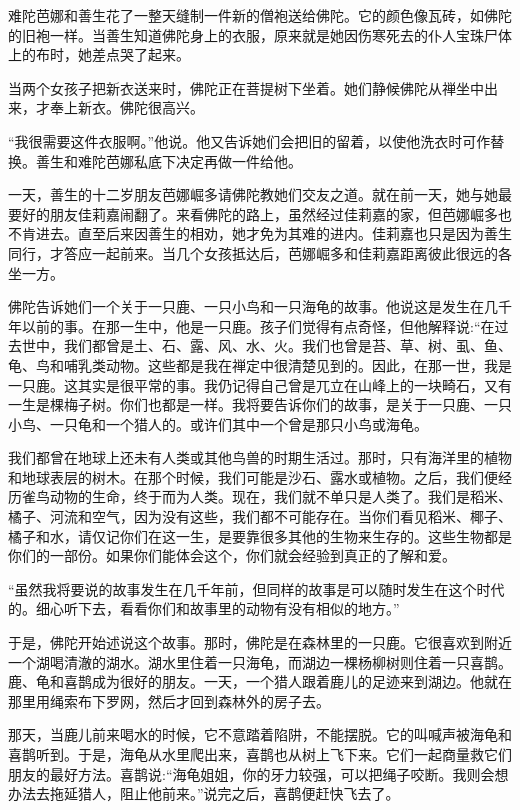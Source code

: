 \documentclass[12pt,twoside,openany]{book}
\begin{document}
难陀芭娜和善生花了一整天缝制一件新的僧袍送给佛陀。它的颜色像瓦砖，如佛陀的旧袍一样。当善生知道佛陀身上的衣服，原来就是她因伤寒死去的仆人宝珠尸体上的布时，她差点哭了起来。

当两个女孩子把新衣送来时，佛陀正在菩提树下坐着。她们静候佛陀从禅坐中出来，才奉上新衣。佛陀很高兴。

“我很需要这件衣服啊。”他说。他又告诉她们会把旧的留着，以使他洗衣时可作替换。善生和难陀芭娜私底下决定再做一件给他。

一天，善生的十二岁朋友芭娜崛多请佛陀教她们交友之道。就在前一天，她与她最要好的朋友佳莉嘉闹翻了。来看佛陀的路上，虽然经过佳莉嘉的家，但芭娜崛多也不肯进去。直至后来因善生的相劝，她才免为其难的进内。佳莉嘉也只是因为善生同行，才答应一起前来。当几个女孩抵达后，芭娜崛多和佳莉嘉距离彼此很远的各坐一方。

佛陀告诉她们一个关于一只鹿、一只小鸟和一只海龟的故事。他说这是发生在几千年以前的事。在那一生中，他是一只鹿。孩子们觉得有点奇怪，但他解释说:“在过去世中，我们都曾是土、石、露、风、水、火。我们也曾是苔、草、树、虱、鱼、龟、鸟和哺乳类动物。这些都是我在禅定中很清楚见到的。因此，在那一世，我是一只鹿。这其实是很平常的事。我仍记得自己曾是兀立在山峰上的一块畸石，又有一生是棵梅子树。你们也都是一样。我将要告诉你们的故事，是关于一只鹿、一只小鸟、一只龟和一个猎人的。或许们其中一个曾是那只小鸟或海龟。

我们都曾在地球上还未有人类或其他鸟兽的时期生活过。那时，只有海洋里的植物和地球表层的树木。在那个时候，我们可能是沙石、露水或植物。之后，我们便经历雀鸟动物的生命，终于而为人类。现在，我们就不单只是人类了。我们是稻米、橘子、河流和空气，因为没有这些，我们都不可能存在。当你们看见稻米、椰子、橘子和水，请仅记你们在这一生，是要靠很多其他的生物来生存的。这些生物都是你们的一部份。如果你们能体会这个，你们就会经验到真正的了解和爱。

“虽然我将要说的故事发生在几千年前，但同样的故事是可以随时发生在这个时代的。细心听下去，看看你们和故事里的动物有没有相似的地方。”

于是，佛陀开始述说这个故事。那时，佛陀是在森林里的一只鹿。它很喜欢到附近一个湖喝清澈的湖水。湖水里住着一只海龟，而湖边一棵杨柳树则住着一只喜鹊。鹿、龟和喜鹊成为很好的朋友。一天，一个猎人跟着鹿儿的足迹来到湖边。他就在那里用绳索布下罗网，然后才回到森林外的房子去。

那天，当鹿儿前来喝水的时候，它不意踏着陷阱，不能摆脱。它的叫喊声被海龟和喜鹊听到。于是，海龟从水里爬出来，喜鹊也从树上飞下来。它们一起商量救它们朋友的最好方法。喜鹊说:“海龟姐姐，你的牙力较强，可以把绳子咬断。我则会想办法去拖延猎人，阻止他前来。”说完之后，喜鹊便赶快飞去了。
\end{document}
